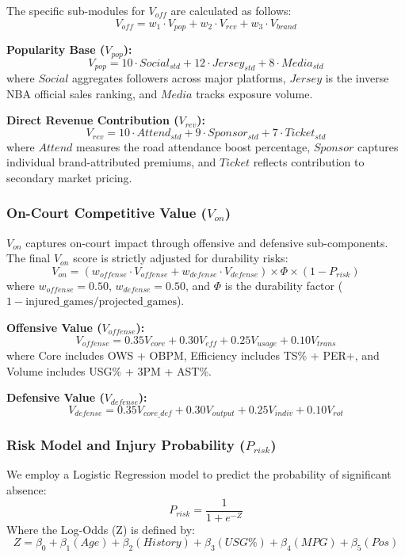 \documentclass[12pt]{article}
\begin{document}
The specific sub-modules for $V_{off}$ are calculated as follows:
\begin{equation}
V_{off} = w_1 \cdot V_{pop} + w_2 \cdot V_{rev} + w_3 \cdot V_{brand}
\end{equation}

\textbf{Popularity Base ($V_{pop}$):}
\begin{equation}
V_{pop} = 10 \cdot Social_{std} + 12 \cdot Jersey_{std} + 8 \cdot Media_{std}
\end{equation}
where $Social$ aggregates followers across major platforms, $Jersey$ is the inverse NBA official sales ranking, and $Media$ tracks exposure volume.

\textbf{Direct Revenue Contribution ($V_{rev}$):}
\begin{equation}
V_{rev} = 10 \cdot Attend_{std} + 9 \cdot Sponsor_{std} + 7 \cdot Ticket_{std}
\end{equation}
where $Attend$ measures the road attendance boost percentage, $Sponsor$ captures individual brand-attributed premiums, and $Ticket$ reflects contribution to secondary market pricing.

\subsubsection{On-Court Competitive Value ($V_{on}$)}
$V_{on}$ captures on-court impact through offensive and defensive sub-components. The final $V_{on}$ score is strictly adjusted for durability risks:
\begin{equation}
V_{on} = (w_{offense} \cdot V_{offense} + w_{defense} \cdot V_{defense}) \times \Phi \times (1 - P_{risk})
\end{equation}
where $w_{offense} = 0.50$, $w_{defense} = 0.50$, and $\Phi$ is the durability factor ($1 - \text{injured\_games}/\text{projected\_games}$).

\textbf{Offensive Value ($V_{offense}$):}
\begin{equation}
V_{offense} = 0.35 V_{core} + 0.30 V_{eff} + 0.25 V_{usage} + 0.10 V_{trans}
\end{equation}
where Core includes OWS + OBPM, Efficiency includes TS\% + PER+, and Volume includes USG\% + 3PM + AST\%.

\textbf{Defensive Value ($V_{defense}$):}
\begin{equation}
V_{defense} = 0.35 V_{core\_def} + 0.30 V_{output} + 0.25 V_{indiv} + 0.10 V_{rot}
\end{equation}

\subsubsection{Risk Model and Injury Probability ($P_{risk}$)}
We employ a Logistic Regression model to predict the probability of significant absence:
\begin{equation}
P_{risk} = \frac{1}{1 + e^{-Z}}
\end{equation}
Where the Log-Odds (Z) is defined by:
\begin{equation}
Z = \beta_0 + \beta_1(Age) + \beta_2(History) + \beta_3(USG\%) + \beta_4(MPG) + \beta_5(Pos)
\end{equation}
\end{document}
